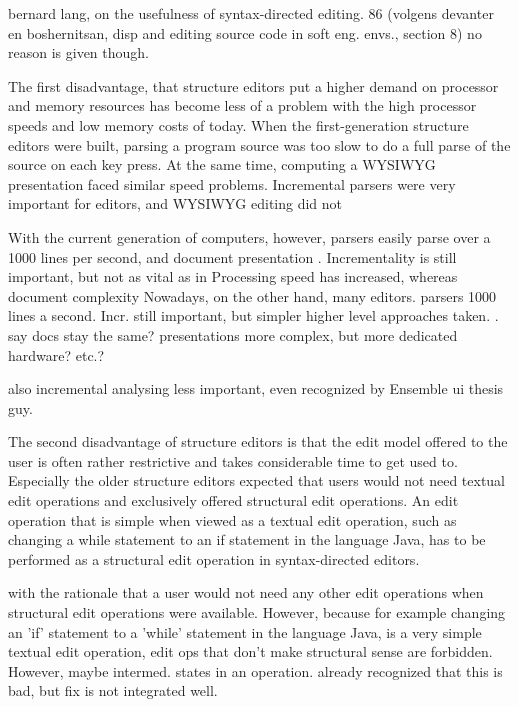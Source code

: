  bernard lang, on the usefulness of syntax-directed editing. 86 (volgens devanter en boshernitsan, disp and editing source code in soft eng. envs., section 8)
 no reason is given though.




The first disadvantage, that structure editors put a higher demand on processor and memory resources has become less of a problem with the high processor speeds and low memory costs of today. When the first-generation structure editors were built, parsing a program source was too slow to do a full parse of the source on each key press. At the same time, computing a WYSIWYG presentation faced similar speed problems. Incremental parsers were very important for editors, and WYSIWYG editing did not 

With the current generation of computers, however, parsers easily parse over a 1000 lines per second, and document presentation . Incrementality is still important, but not as vital as in %
Processing speed has increased, whereas document complexity Nowadays, on the other hand, many editors. parsers 1000 lines a second. Incr. still important, but simpler higher level approaches taken. 
. say docs stay the same? presentations more complex, but more dedicated hardware? etc.?

also incremental analysing less important, even recognized by Ensemble ui thesis guy.


The second disadvantage of structure editors is that the edit model offered to the user is often rather restrictive and takes considerable time to get used to. Especially the older structure editors expected that users would not need textual edit operations and exclusively offered structural edit operations. An edit operation that is simple when viewed as a textual edit operation, such as changing a while statement to an if statement in the language Java, has to be performed as a structural edit operation in syntax-directed editors. 

 with the rationale that a user would not need any other edit operations when structural edit operations were available. However, because for example changing an 'if' statement to a 'while' statement in the language Java, is a very simple textual edit operation, 
edit ops that don't make structural sense are forbidden. However, maybe intermed. states in an operation. 
already recognized that this is bad, but fix is not integrated well.

